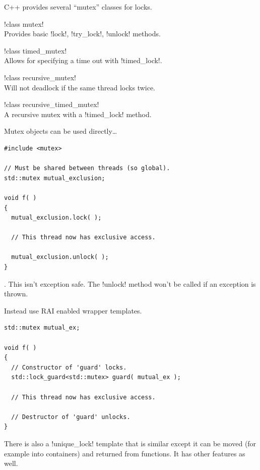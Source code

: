 \documentclass[landscape]{slides}
\begin{document}

C++ provides several ``mutex'' classes for locks.
\begin{citemize}
  \item !class mutex!\\
    Provides basic !lock!, !try_lock!, !unlock! methods.
  \item !class timed_mutex!\\
    Allows for specifying a time out with !timed_lock!.
  \item !class recursive_mutex!\\
    Will not deadlock if the same thread locks twice.
  \item !class recursive_timed_mutex!\\
    A recursive mutex with a !timed_lock! method.
\end{citemize}
\stopslide


Mutex objects can be used directly\ldots
\vspace{5mm}
{\small
\begin{lstlisting}
#include <mutex>

// Must be shared between threads (so global).
std::mutex mutual_exclusion;

void f( )
{
  mutual_exclusion.lock( );

  // This thread now has exclusive access.

  mutual_exclusion.unlock( );
}
\end{lstlisting}
}
. This isn't exception safe. The !unlock! method won't be called if an
exception is thrown.
\stopslide


Instead use RAI enabled wrapper templates.
\vspace{5mm}
{\small
\begin{lstlisting}
std::mutex mutual_ex;

void f( )
{
  // Constructor of 'guard' locks.
  std::lock_guard<std::mutex> guard( mutual_ex );

  // This thread now has exclusive access.

  // Destructor of 'guard' unlocks.
}
\end{lstlisting}
}

There is also a !unique_lock! template that is similar except it can be moved (for example into
containers) and returned from functions. It has other features as well.
\stopslide
\end{document}
